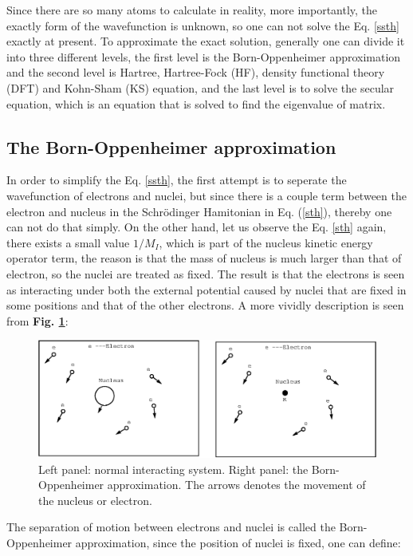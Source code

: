 \documentclass[a4paper, 12pt, titlepage,oneside,drop]{kthesis}
\begin{document}
Since there are so many atoms to calculate in reality, more importantly, the exactly form of the wavefunction is unknown,
so one can not solve the Eq. \ref{ssth} exactly at present. To approximate the exact solution, 
generally one can divide it into three different levels, the first level is the Born-Oppenheimer approximation and the second level is Hartree,
Hartree-Fock (HF), density functional theory (DFT) and Kohn-Sham (KS) equation, and the last level is to solve the secular equation, 
which is an equation that is solved to find the eigenvalue of matrix.

\subsection{The Born-Oppenheimer approximation}
\label{ch:boa}

In order to simplify the Eq. \ref{ssth}, the first attempt is to seperate the wavefunction of electrons and nuclei, but since there is a couple term between the electron and nucleus in the Schrödinger Hamitonian in Eq. (\ref{sth}), 
thereby one can not do that simply. On the other hand, let us observe the Eq. \ref{sth} again, there exists a small value ${1}/{M_I}$, which is part of the nucleus kinetic energy
operator term, the reason is that the mass of nucleus is much larger than that of electron, so the nuclei are treated as fixed. The result is that the electrons is seen as interacting under both the external potential caused by nuclei that are fixed in 
some positions and that of the other electrons. A more vividly description is seen from \textbf{Fig. \ref{figbo}}:

\begin{figure}[H]
\centering
\includegraphics[scale=.7]{system.eps}
\caption{Left panel: normal interacting system. Right panel: the Born-Oppenheimer approximation. The arrows denotes the movement of the nucleus or electron.}
\label{figbo}
\end{figure}

The separation of motion between electrons and nuclei is called the Born-Oppenheimer approximation, since the position of nuclei is fixed, one can define:
\end{document}
